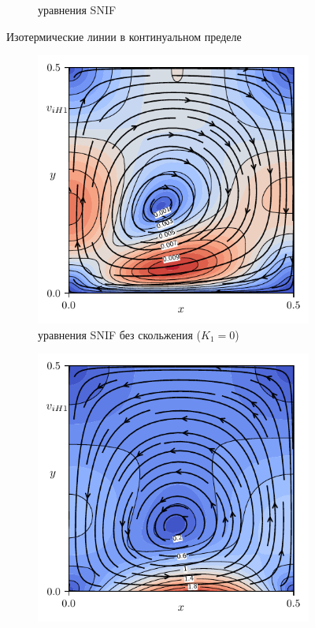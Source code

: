 \documentclass[10pt]{article}
\begin{document}
\begin{figure}
\begin{subfigure}[b]{0.5\linewidth}
        \caption{уравнения SNIF}
        \label{fig:continuum:temp-snif}
    \end{subfigure}
    \caption{Изотермические линии в континуальном пределе}
    \label{fig:continuum:temp}
\end{figure}

\begin{figure}
    \centering
    \begin{subfigure}{0.5\linewidth}
        \centering
        \includegraphics{contours/nonslip-0-vel}
        \caption{уравнения SNIF без скольжения (\(K_1=0\))}
        \label{fig:continuum:flow-nonslip}
    \end{subfigure}%
    \begin{subfigure}{0.5\linewidth}
        \centering
        \includegraphics{contours/asym-0-vel}

\end{subfigure}
\end{figure}
\end{document}
